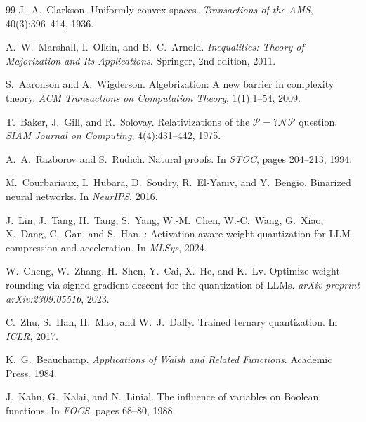\documentclass[11pt]{article}
\begin{document}
\begin{thebibliography}{99}
J.~A.~Clarkson.
\newblock Uniformly convex spaces.
\newblock \emph{Transactions of the AMS}, 40(3):396--414, 1936.

A.~W.~Marshall, I.~Olkin, and B.~C.~Arnold.
\newblock \emph{Inequalities: Theory of Majorization and Its Applications}.
\newblock Springer, 2nd edition, 2011.

S.~Aaronson and A.~Wigderson.
\newblock Algebrization: A new barrier in complexity theory.
\newblock \emph{ACM Transactions on Computation Theory}, 1(1):1--54, 2009.

T.~Baker, J.~Gill, and R.~Solovay.
\newblock Relativizations of the $\mathcal{P} = ?\mathcal{NP}$ question.
\newblock \emph{SIAM Journal on Computing}, 4(4):431--442, 1975.

A.~A.~Razborov and S.~Rudich.
\newblock Natural proofs.
\newblock In \emph{STOC}, pages 204--213, 1994.

M.~Courbariaux, I.~Hubara, D.~Soudry, R.~El-Yaniv, and Y.~Bengio.
\newblock Binarized neural networks.
\newblock In \emph{NeurIPS}, 2016.

J.~Lin, J.~Tang, H.~Tang, S.~Yang, W.-M.~Chen, W.-C.~Wang, G.~Xiao, X.~Dang, C.~Gan, and S.~Han.
: Activation-aware weight quantization for {LLM} compression and acceleration.
\newblock In \emph{MLSys}, 2024.

W.~Cheng, W.~Zhang, H.~Shen, Y.~Cai, X.~He, and K.~Lv.
\newblock Optimize weight rounding via signed gradient descent for the quantization of {LLMs}.
\newblock \emph{arXiv preprint arXiv:2309.05516}, 2023.

C.~Zhu, S.~Han, H.~Mao, and W.~J.~Dally.
\newblock Trained ternary quantization.
\newblock In \emph{ICLR}, 2017.

K.~G.~Beauchamp.
\newblock \emph{Applications of Walsh and Related Functions}.
\newblock Academic Press, 1984.

J.~Kahn, G.~Kalai, and N.~Linial.
\newblock The influence of variables on {Boolean} functions.
\newblock In \emph{FOCS}, pages 68--80, 1988.


\end{thebibliography}
\end{document}
